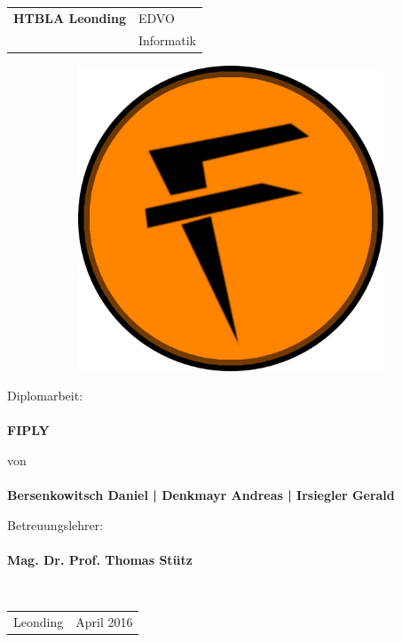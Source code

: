 \documentclass[FIPLY_base.tex]{subfiles}
\begin{document}
	\begin{center}
		\begin{tabular}{ p{3.7cm} | p{3.7cm} }
			\textbf{HTBLA Leonding} & {EDVO}  \\
			& {Informatik}
		\end{tabular} 
	\end{center}
	\begin{figure}[h]
		\begin{subfigure}[b]{1\textwidth}
			\centering
			\includegraphics[scale=1]{img/icons/splash1}
		\end{subfigure}
	\end{figure}
	\begin{center}
		{\large Diplomarbeit:}\ \\ \ \\
		\textbf{{\huge FIPLY}}
	\end{center}
	\begin{center}
		{\large von}\ \\ \ \\
		\textbf{{Bersenkowitsch Daniel | Denkmayr Andreas | Irsiegler Gerald}}
	\end{center}
	\begin{center}
		{\large Betreuungslehrer:}\ \\ \ \\
		\textbf{{Mag. Dr. Prof. Thomas Stütz}}
	\end{center}
	\ \\
	\begin{center}
		\begin{tabular}{ p{2cm} | p{2cm} }
			Leonding & {April 2016} 
		\end{tabular} 
	\end{center}
\end{document}
